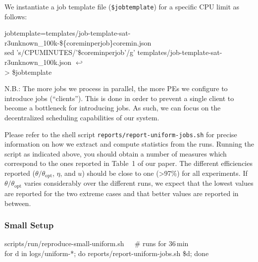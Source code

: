 \documentclass[runningheads]{article}
\newcommand{\CR}{{\tiny$\hookleftarrow$}}
\numberwithin{dummy}{subsection}
\begin{document}
\vspace{0.4cm}

We instantiate a job template file (\texttt{\$jobtemplate}) for a specific CPU limit as follows:

\begin{ttfenv}
jobtemplate=templates/job-template-sat-r3unknown\_100k-\$\{coreminperjob\}coremin.json\\
sed 's/CPUMINUTES/'\$coreminperjob'/g' templates/job-template-sat-r3unknown\_100k.json \CR\\
> \$jobtemplate
\end{ttfenv}

N.B.: The more jobs we process in parallel, the more PEs we configure to introduce jobs (``clients'').
This is done in order to prevent a single client to become a bottleneck for introducing jobs.
As such, we can focus on the decentralized scheduling capabilities of our system.

Please refer to the shell script \texttt{reports/report-uniform-jobs.sh} for precise information on how we extract and compute statistics from the runs.
Running the script as indicated above, you should obtain a number of measures which correspond to the ones reported in Table~1 of our paper.
The different efficiencies reported ($\theta/\theta_{\text{opt}}$, $\eta$, and $u$) should be close to one (>97\%) for all experiments.
If $\theta/\theta_{\text{opt}}$ varies considerably over the different runs, we expect that the lowest values are reported for the two extreme cases and that better values are reported in between.

\subsubsection{Small Setup}

\begin{tcolorbox}[
  colback=Magenta!5!white,
  colframe=Magenta!75!black,
  title={\centering In a Nutshell: Commands for Small Setup (Section~\ref{sec:small-setup})}]
\begin{ttfenvcompact}
scripts/run/reproduce-small-uniform.sh\ \ \ \# runs for 36\,min \\
for d in logs/uniform-*; do reports/report-uniform-jobs.sh \$d; done
\end{ttfenvcompact}
\end{tcolorbox}
\end{document}
